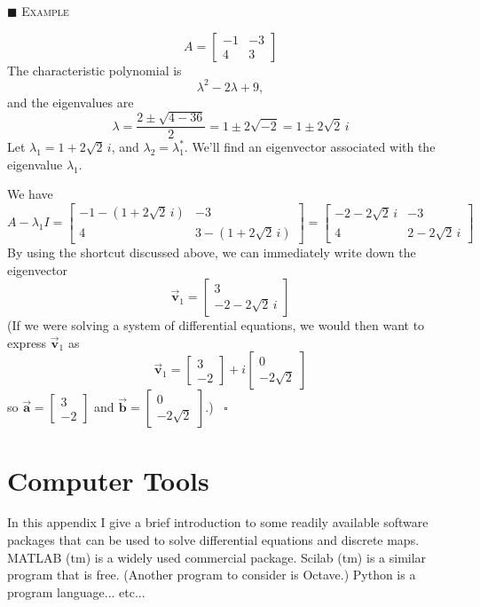 \documentclass[reqno]{immbook}
\newcommand{\BA}{\vec{\textbf{a}}}
\newcommand{\BB}{\vec{\textbf{b}}}
\newcommand{\BV}{\vec{\textbf{v}}}
\numberwithin{equation}{chapter}
\numberwithin{question}{section}
\numberwithin{theorem}{chapter}
\numberwithin{figure}{chapter}
\theoremstyle{definition}
\newenvironment{xexample}%
{%

\medskip\noindent\addtocounter{example}{1}$\blacksquare$ \textsc{Example \theexample}\hspace*{1em}%
}%
{%
~\hfill$\square$

\medskip
}
\begin{document}
\begin{xexample}
\[
   A = \begin{bmatrix} -1 & -3 \\ 4 & 3 \end{bmatrix}
\]
The characteristic polynomial is
\[
  \lambda^2 - 2\lambda + 9,
\]
and the eigenvalues are
\[
  \lambda = \frac{2\pm \sqrt{4-36}}{2} = 1\pm 2\sqrt{-2}
    = 1 \pm 2 \sqrt{2} \, i
\]
Let $\lambda_1 = 1 + 2\sqrt{2}\, i$, and $\lambda_2 = \lambda_1^{*}$.
We'll find an eigenvector associated with
the eigenvalue $\lambda_1$.

We have
\[
   A - \lambda_1 I = \begin{bmatrix}
                        -1-(1+2\sqrt{2}\,i) & -3 \\
			4 & 3-(1+2\sqrt{2}\,i)
                     \end{bmatrix}
		   = \begin{bmatrix}
		        -2-2\sqrt{2}\, i & -3 \\
			4 & 2-2\sqrt{2}\,i
		     \end{bmatrix}
\]
By using the shortcut discussed above, we can
immediately write down the eigenvector
\[
  \BV_1 = \begin{bmatrix} 3 \\ -2-2\sqrt{2}\, i \end{bmatrix}
\]
(If we were solving a system of differential equations, we would
then want to express $\BV_1$ as
\[
   \BV_1 = \begin{bmatrix} 3 \\ -2 \end{bmatrix}
           + i \begin{bmatrix} 0 \\ -2\sqrt{2} \end{bmatrix}
\]
so $\BA = \begin{bmatrix} 3 \\ -2\end{bmatrix}$
and $\BB = \begin{bmatrix} 0 \\ -2\sqrt{2} \end{bmatrix}$.)
\end{xexample}
%
%
%
\chapter{Computer Tools}
%
%
In this appendix I give a brief introduction to some
readily available software packages that can be used to solve
differential equations and discrete maps.  MATLAB (tm)
is a widely used commercial package.
Scilab (tm)\cite{SCILAB} is a similar program that is free.
(Another program to consider is Octave.)
Python is a program language... etc...
\end{document}
